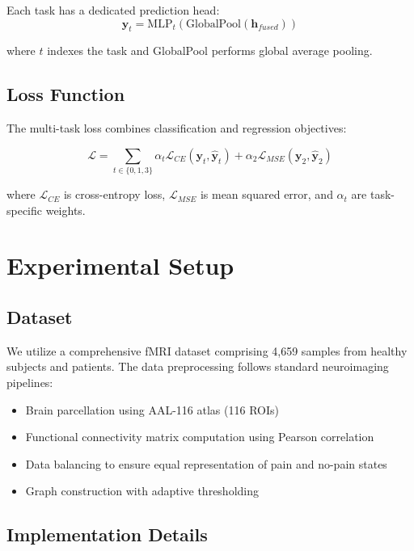 \documentclass[10pt,journal,compsoc]{IEEEtran}
\begin{document}
Each task has a dedicated prediction head:
\begin{equation}
\mathbf{y}_t = \text{MLP}_t(\text{GlobalPool}(\mathbf{h}_{fused}))
\end{equation}

where $t$ indexes the task and GlobalPool performs global average pooling.

\subsection{Loss Function}

The multi-task loss combines classification and regression objectives:

\begin{equation}
\mathcal{L} = \sum_{t \in \{0,1,3\}} \alpha_t \mathcal{L}_{CE}(\mathbf{y}_t, \hat{\mathbf{y}}_t) + \alpha_2 \mathcal{L}_{MSE}(\mathbf{y}_2, \hat{\mathbf{y}}_2)
\end{equation}

where $\mathcal{L}_{CE}$ is cross-entropy loss, $\mathcal{L}_{MSE}$ is mean squared error, and $\alpha_t$ are task-specific weights.

\section{Experimental Setup}

\subsection{Dataset}

We utilize a comprehensive fMRI dataset comprising 4,659 samples from healthy subjects and patients. The data preprocessing follows standard neuroimaging pipelines:

\begin{itemize}
\item Brain parcellation using AAL-116 atlas (116 ROIs)
\item Functional connectivity matrix computation using Pearson correlation
\item Data balancing to ensure equal representation of pain and no-pain states
\item Graph construction with adaptive thresholding
\end{itemize}

\subsection{Implementation Details}
\end{document}
